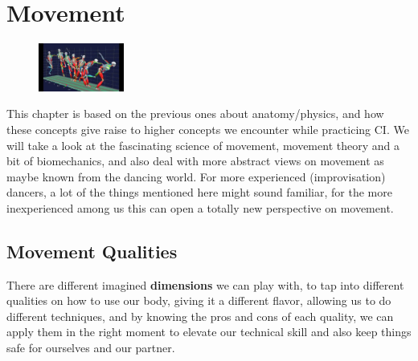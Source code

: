 \chapter{Movement}\label{ch:movement}

\begin{figure}
    \centering
    \includegraphics[width=0.25\textwidth]{images/movement}
\end{figure}

This chapter is based on the previous ones about anatomy/physics, and how these concepts give raise to higher concepts we encounter while practicing CI\@.
We will take a look at the fascinating science of movement, movement theory and a bit of biomechanics, and also deal with more abstract views on movement as maybe known from the dancing world.
For more experienced (improvisation) dancers, a lot of the things mentioned here might sound familiar, for the more inexperienced among us this can open a totally new perspective on movement.

\section{Movement Qualities}\label{sec:movement-qualities}

There are different imagined \textbf{dimensions} we can play with, to tap into different qualities on how to use our body, giving it a different flavor, allowing us to do different techniques, and by knowing the pros and cons of each quality, we can apply them in the right moment to elevate our technical skill and also keep things safe for ourselves and our partner.

